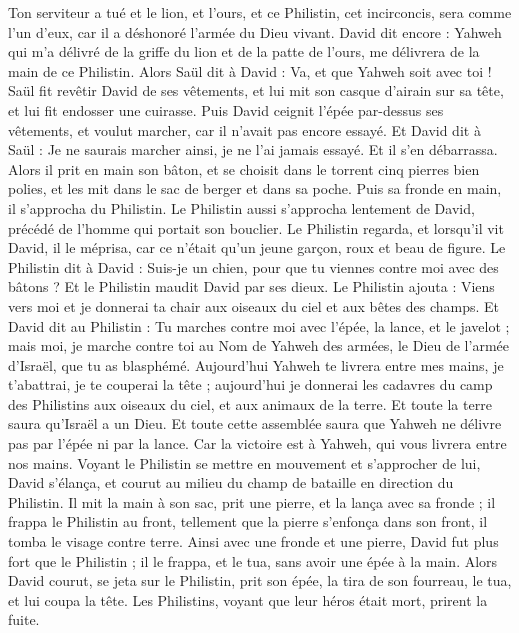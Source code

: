 \begin{multicols}{2}
Ton serviteur a tué et le lion, et l'ours, et ce Philistin, cet incirconcis, sera comme l'un d'eux, car il a déshonoré l'armée du Dieu vivant.
David dit encore : Yahweh qui m'a délivré de la griffe du lion et de la patte de l'ours, me délivrera de la main de ce Philistin. Alors Saül dit à David : Va, et que Yahweh soit avec toi !
Saül fit revêtir David de ses vêtements, et lui mit son casque d'airain sur sa tête, et lui fit endosser une cuirasse.
Puis David ceignit l'épée par-dessus ses vêtements, et voulut marcher, car il n'avait pas encore essayé. Et David dit à Saül : Je ne saurais marcher ainsi, je ne l'ai jamais essayé. Et il s'en débarrassa.
Alors il prit en main son bâton, et se choisit dans le torrent cinq pierres bien polies, et les mit dans le sac de berger et dans sa poche. Puis sa fronde en main, il s'approcha du Philistin.
Le Philistin aussi s'approcha lentement de David, précédé de l'homme qui portait son bouclier.
Le Philistin regarda, et lorsqu'il vit David, il le méprisa, car ce n'était qu'un jeune garçon, roux et beau de figure.
Le Philistin dit à David : Suis-je un chien, pour que tu viennes contre moi avec des bâtons ? Et le Philistin maudit David par ses dieux.
Le Philistin ajouta : Viens vers moi et je donnerai ta chair aux oiseaux du ciel et aux bêtes des champs.
Et David dit au Philistin : Tu marches contre moi avec l'épée, la lance, et le javelot ; mais moi, je marche contre toi au Nom de Yahweh des armées, le Dieu de l'armée d'Israël, que tu as blasphémé.
Aujourd'hui Yahweh te livrera entre mes mains, je t'abattrai, je te couperai la tête ; aujourd'hui je donnerai les cadavres du camp des Philistins aux oiseaux du ciel, et aux animaux de la terre. Et toute la terre saura qu'Israël a un Dieu.
Et toute cette assemblée saura que Yahweh ne délivre pas par l'épée ni par la lance. Car la victoire est à Yahweh, qui vous livrera entre nos mains.
Voyant le Philistin se mettre en mouvement et s'approcher de lui, David s'élança, et courut au milieu du champ de bataille en direction du Philistin.
Il mit la main à son sac, prit une pierre, et la lança avec sa fronde ; il frappa le Philistin au front, tellement que la pierre s'enfonça dans son front, il tomba le visage contre terre.
Ainsi avec une fronde et une pierre, David fut plus fort que le Philistin ; il le frappa, et le tua, sans avoir une épée à la main.
Alors David courut, se jeta sur le Philistin, prit son épée, la tira de son fourreau, le tua, et lui coupa la tête. Les Philistins, voyant que leur héros était mort, prirent la fuite.

\end{multicols}
